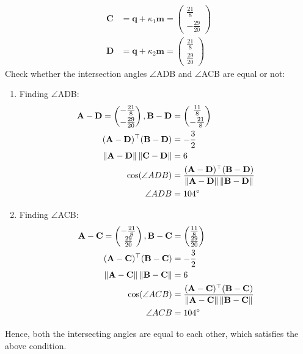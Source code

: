 \documentclass[12pt]{article}
\providecommand{\norm}[1]{\left\lVert#1\right\rVert}
\newcommand{\myvec}[1]{\ensuremath{\begin{pmatrix}#1\end{pmatrix}}}
\let\vec\mathbf
\let\vec\mathbf
\providecommand{\norm}[1]{\left\lVert#1\right\rVert}
\let\vec\mathbf
\begin{document}
\begin{align}
    \vec{C}&=\vec{q}+\kappa_1\vec{m}=\myvec{\frac{21}{8}\\[2pt]-\frac{29}{20}}\\
    \vec{D}&=\vec{q}+\kappa_2\vec{m}=\myvec{\frac{21}{8}\\[2pt]\frac{29}{20}}
\end{align}
Check whether the intersection angles $\angle$ADB and $\angle$ACB are equal or not:
\begin{enumerate}
\item Finding $\angle$ADB:
	\begin{align}
		 \vec{A-D} = \myvec{-\frac{21}{8}\\[2pt]-\frac{29}{20}},
		\vec{B-D}& = \myvec{\frac{11}{8}\\[2pt]-\frac{21}{8}}\\
	 \vec{(A-D)^\top(B-D)}&= -\frac{3}{2}\\
	 \norm{\vec{A-D}}\norm{\vec{C-D}}& = 6\\
		\cos(\angle ADB)& = \frac{\vec{(A-D)^\top(B-D)}}{\norm{\vec{A-D}}\norm{\vec{B-D}}}\\
		\angle ADB&=104\degree
\end{align}
\item Finding $\angle$ACB:
\begin{align}
	\vec{A-C} = \myvec{-\frac{21}{8}\\\frac{29}{20}},
	 \vec{B-C}& = \myvec{\frac{11}{8}\\\frac{29}{20}}\\
	 \vec{(A-C)^\top(B-C)}&= -\frac{3}{2}\\
	 \norm{\vec{A-C}}\norm{\vec{B-C}}& = 6\\
	 \cos(\angle ACB) &= \frac{\vec{(A-C)^\top(B-C)}}{\norm{\vec{A-C}}\norm{\vec{B-C}}}\\
	 \angle ACB&=104\degree
\end{align}
\end{enumerate}
Hence, both the intersecting angles are equal to each other, which satisfies the above condition.
\end{document}
